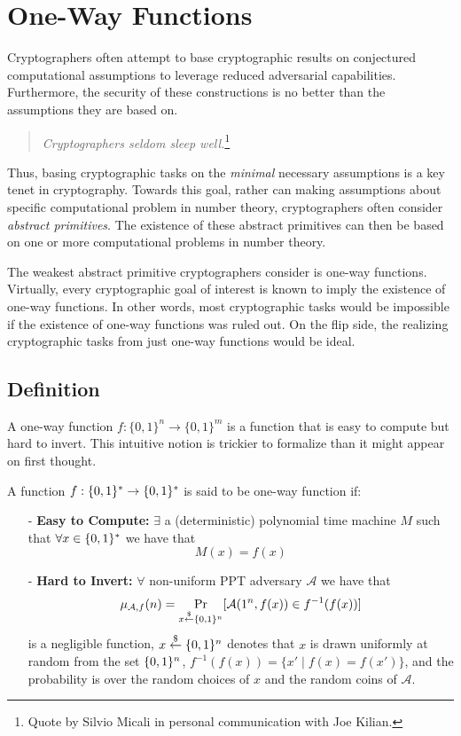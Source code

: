 \documentclass[12pt]{tufte-book}
\begin{document}
\chapter{One-Way Functions}
\label{sec:owf}

\label{ssec:owf}
Cryptographers often attempt to base cryptographic results on conjectured computational assumptions to leverage reduced adversarial capabilities. Furthermore, the security of these constructions is no better than the assumptions they are based on. 
\begin{quote}
\emph{Cryptographers seldom sleep well.}\footnote{Quote by Silvio Micali in personal communication with Joe Kilian.}
\end{quote}
Thus, basing cryptographic tasks on the \emph{minimal} necessary assumptions is a key tenet in cryptography. Towards this goal, rather can making assumptions about specific computational problem in number theory, cryptographers often consider \emph{abstract primitives}. The existence of these abstract primitives can then be based on one or more computational problems in number theory.

The weakest abstract primitive cryptographers consider is one-way functions. Virtually, every cryptographic goal of interest is known to imply the existence of one-way functions. In other words, most cryptographic tasks would be impossible if the existence of one-way functions was ruled out. On the flip side, the realizing cryptographic tasks from just one-way functions would be ideal. 

\section{Definition}
A one-way function $f: \{0,1\}^n \rightarrow \{0,1\}^m$ is a function that is easy to compute but hard to invert. This intuitive notion is trickier to formalize than it might appear on first thought.

\begin{definition}
A function $f : \{0,1\}^{*} \rightarrow \{0,1\}^{*}$ is said to be one-way function if:
\begin{itemize}
\item[-] \textbf{Easy to Compute:} $\exists$ a (deterministic) polynomial time machine $M$ such that $\forall x \in \{0,1\}^{*}$ we have that \[M(x) = f(x)\]

\item[-] \textbf{Hard to Invert:} $\forall$ non-uniform PPT adversary $\mathcal{A}$ we have that
    \begin{equation}\label{eq:owf}
    \mu_{\mathcal{A},f}(n) = \Pr_{x \stackrel{\$}{\leftarrow} \{0,1\}^{n}}[ \mathcal{A}(1^n, f(x)) \in f^{-1}(f(x))]
     \end{equation}
     is a negligible function,  $x \overset{\$}{\leftarrow} \{0,1\}^{n}$ denotes that $x$ is drawn uniformly at random from the set $\{0,1\}^{n}$, $f^{-1}(f(x)) = \{x' \mid f(x) = f(x')\}$, and the probability is over the random choices of $x$ and the random coins of $\mathcal{A}$\footnotemark.
\end{itemize}
\end{definition}
\end{document}
